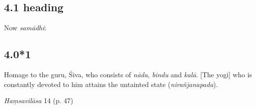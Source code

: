 

\pagestyle{HPed}
\begin{ekdosis}


\subsection*{4.1 heading}
\begin{translation}[hp04_001a]
Now \emph{samādhi}:
\end{translation}


\subsection*{4.0*1}
\begin{translation}[hp04_000_1] 
Homage to the guru, Śiva, who consists of \emph{nāda}, \emph{bindu} and \emph{kalā}. [The yogi] who is constantly devoted to him attains the untainted state (\emph{nirañjanapada}).
\end{translation}


\begin{testimonia}[hp04_000_1]
\emph{Haṃsavilāsa} 14 (p. 47)
\begin{versinnote}
\end{versinnote}
\end{testimonia}

\begin{philcomm}[hp04_000_1]




\end{philcomm}
\end{ekdosis}
